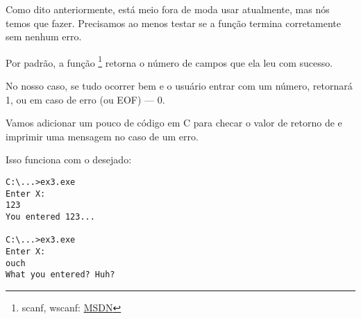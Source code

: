 
Como dito anteriormente, está meio fora de moda usar \scanf atualmente, mas nós temos que fazer.
Precisamos ao menos testar se a função \scanf termina corretamente sem nenhum erro.



Por padrão, a função \scanf\footnote{scanf, wscanf: \href{http://go.yurichev.com/17255}{MSDN}} retorna o número de campos que ela leu com sucesso.

No nosso caso, se tudo ocorrer bem e o usuário entrar com um número, \scanf retornará 1, ou em caso de erro (ou \ac{EOF}) --- 0.

Vamos adicionar um pouco de código em C para checar o valor de retorno de \scanf e imprimir uma mensagem no caso de um erro.

Isso funciona com o desejado:

\begin{lstlisting}
C:\...>ex3.exe
Enter X:
123
You entered 123...

C:\...>ex3.exe
Enter X:
ouch
What you entered? Huh?
\end{lstlisting}






\subsectionold{\Exercise}

\PTBRph{}

